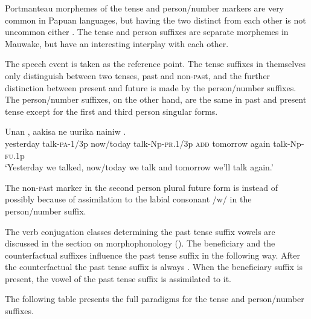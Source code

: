 Portmanteau morphemes of the tense and person/number markers are very common in Papuan languages, but having the two distinct from each other is not uncommon either \citep[137]{Foley1986}. The tense and person suffixes are separate morphemes in Mauwake, but have an interesting interplay with each other.

The speech event is taken as the reference point. The tense suffixes in themselves only distinguish between two tenses, past and non-\textsc{pa}st, and the further distinction between present and future is made by the person/number suffixes. The person/number suffixes, on the other hand, are the same in past and present tense except for the first and third person singular forms. 

\ea%
\label{ex:x1029}
\gll Unan , aakisa  ne uurika nainiw .\\
yesterday talk-\textsc{pa}-1/3p now/today talk-Np-\textsc{pr}.1/3p \textsc{add} tomorrow again talk-Np-\textsc{fu}.1p\\
\glt`Yesterday we talked, now/today we talk and tomorrow we'll talk again.'
\z

The non-\textsc{pa}st marker in the second person plural future form is \textstyleEmphasizedVernacularWords{\nobreakdash-} instead of \textstyleEmphasizedVernacularWords{\nobreakdash-} possibly because of assimilation to the labial consonant /w/ in the person/number suffix. 

The verb conjugation classes determining the past tense suffix vowels are discussed in the section on morphophonology (). The beneficiary and the counterfactual suffixes influence the past tense suffix in the following way. After the counterfactual the past tense suffix is always \textstyleEmphasizedVernacularWords{\nobreakdash-}. When the beneficiary suffix is present, the vowel of the past tense suffix is assimilated to it.

The following table presents the full paradigms for the tense and person/number suffixes.


\begin{table}
\caption{Tense and person/number suffixes}
\label{tab:13}
\end{table}

